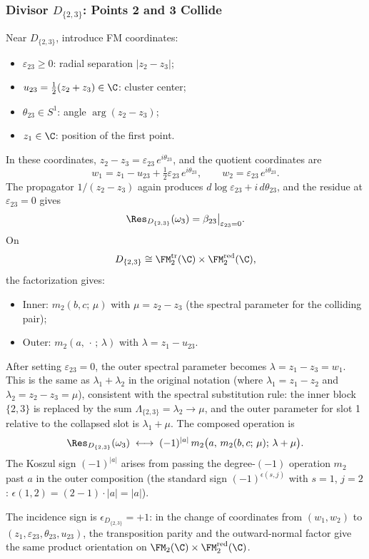 \subsubsection{Divisor $D_{\{2,3\}}$: Points 2 and 3 Collide}

\begin{computation}[$D_{\{2,3\}}$ residue]
\label{comp:D23}
Near $D_{\{2,3\}}$, introduce FM coordinates:
\begin{itemize}
\item $\varepsilon_{23} \geq 0$: radial separation $|z_2 - z_3|$;
\item $u_{23} = \tfrac{1}{2}(z_2 + z_3) \in \C$: cluster center;
\item $\theta_{23} \in S^1$: angle $\arg(z_2 - z_3)$;
\item $z_1 \in \C$: position of the first point.
\end{itemize}
In these coordinates, $z_2 - z_3 = \varepsilon_{23}\, e^{i\theta_{23}}$, and the quotient coordinates are
\[
w_1 = z_1 - u_{23} + \tfrac{1}{2}\varepsilon_{23}\, e^{i\theta_{23}}, \qquad
w_2 = \varepsilon_{23}\, e^{i\theta_{23}}.
\]
The propagator $1/(z_2 - z_3)$ again produces $d\log\varepsilon_{23} + i\, d\theta_{23}$, and the residue at $\varepsilon_{23} = 0$ gives
\[
\Res_{D_{\{2,3\}}}(\omega_3) = \beta_{23}\big|_{\varepsilon_{23}=0}.
\]
On
\[
D_{\{2,3\}}\cong
\FM_2^{\mathrm{tr}}(\C)\times\FM_2^{\mathrm{red}}(\C),
\]
the factorization gives:
\begin{itemize}
\item Inner: $m_2(b, c;\, \mu)$ with $\mu = z_2 - z_3$ (the spectral parameter for the colliding pair);
\item Outer: $m_2(a,\, \cdot\,;\, \lambda)$ with $\lambda = z_1 - u_{23}$.
\end{itemize}
After setting $\varepsilon_{23} = 0$, the outer spectral parameter becomes $\lambda = z_1 - z_3 = w_1$. This is the same as $\lambda_1 + \lambda_2$ in the original notation (where $\lambda_1 = z_1 - z_2$ and $\lambda_2 = z_2 - z_3 = \mu$), consistent with the spectral substitution rule: the inner block $\{2,3\}$ is replaced by the sum $\Lambda_{\{2,3\}} = \lambda_2 \to \mu$, and the outer parameter for slot 1 relative to the collapsed slot is $\lambda_1 + \mu$. The composed operation is
\[
\Res_{D_{\{2,3\}}}(\omega_3) \;\longleftrightarrow\; (-1)^{|a|}\, m_2\bigl(a,\, m_2(b,c;\,\mu);\, \lambda + \mu\bigr).
\]
The Koszul sign $(-1)^{|a|}$ arises from passing the degree-$(-1)$ operation $m_2$ past $a$ in the outer composition (the standard sign $(-1)^{\epsilon(s,j)}$ with $s=1$, $j=2$: $\epsilon(1,2) = (2-1)\cdot |a| = |a|$).

The incidence sign is \(\epsilon_{D_{\{2,3\}}}=+1\): in the
change of coordinates from \((w_1,w_2)\) to
\((z_1,\varepsilon_{23},\theta_{23},u_{23})\), the transposition
parity and the outward-normal factor give the same product
orientation on
\(\FM_2(\C)\times\FM_2^{\mathrm{red}}(\C)\).
\end{computation}

